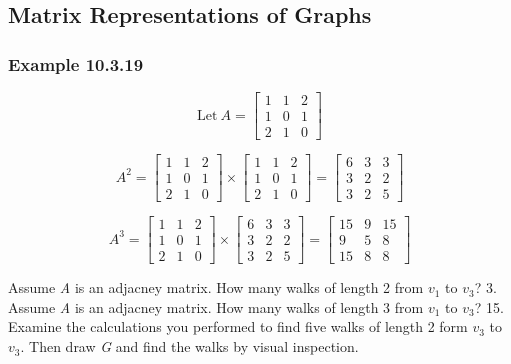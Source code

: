 \documentclass{article}
\begin{document}
\setcounter{section}{10}
\setcounter{subsection}{2}
\subsection{Matrix Representations of Graphs}
\subsubsection{Example 10.3.19}
\[\text{Let} \ A =
\begin{bmatrix}
1 & 1 & 2 \\
1 & 0 & 1 \\
2 & 1 & 0
\end{bmatrix}
\]


\[
A^2 =
\begin{bmatrix}
1 & 1 & 2 \\
1 & 0 & 1 \\
2 & 1 & 0
\end{bmatrix}
\times
\begin{bmatrix}
1 & 1 & 2 \\
1 & 0 & 1 \\
2 & 1 & 0
\end{bmatrix}
=
\begin{bmatrix}
6 & 3 & 3 \\
3 & 2 & 2 \\
3 & 2 & 5
\end{bmatrix}
\]

\[
A^3 =
\begin{bmatrix}
1 & 1 & 2 \\
1 & 0 & 1 \\
2 & 1 & 0
\end{bmatrix}
\times
\begin{bmatrix}
6 & 3 & 3 \\
3 & 2 & 2 \\
3 & 2 & 5
\end{bmatrix}
=
\begin{bmatrix}
15 & 9 & 15 \\
9 & 5 & 8 \\
15 & 8 & 8
\end{bmatrix}
\]


Assume \textit{A} is an adjacney matrix. How many walks of length 2 from $v_1$ to $v_3$? 3. \\

Assume \textit{A} is an adjacney matrix. How many walks of length 3 from $v_1$ to $v_3$? 15. \\

Examine the calculations you performed to find five walks of length 2 form $v_3$ to $v_3$. Then draw \textit{G} and find the walks by visual inspection.
\end{document}

